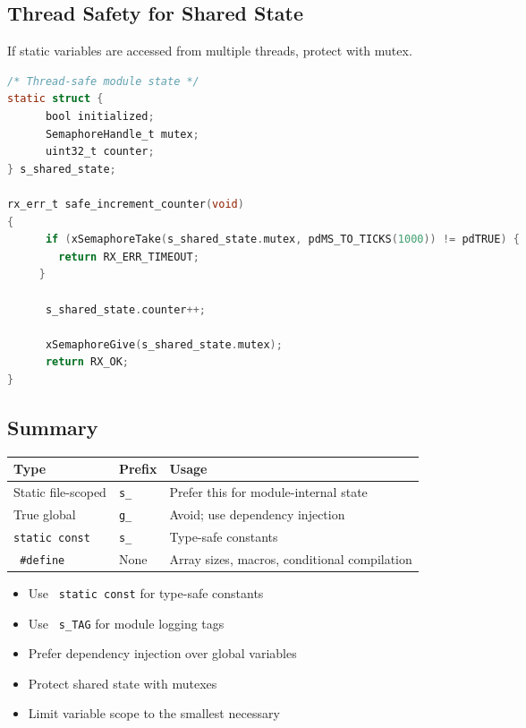 \subsection{Thread Safety for Shared State}

If static variables are accessed from multiple threads, protect with mutex.

\begin{lstlisting}[language=C]
/* Thread-safe module state */
static struct {
      bool initialized;
      SemaphoreHandle_t mutex;
      uint32_t counter;
} s_shared_state;

rx_err_t safe_increment_counter(void)
{
      if (xSemaphoreTake(s_shared_state.mutex, pdMS_TO_TICKS(1000)) != pdTRUE) {
        return RX_ERR_TIMEOUT;
     }

      s_shared_state.counter++;

      xSemaphoreGive(s_shared_state.mutex);
      return RX_OK;
}
\end{lstlisting}

\subsection{Summary}

\begin{center}
\begin{tabular}{|l|l|l|}
\hline
\textbf{Type} & \textbf{Prefix} & \textbf{Usage} \\
\hline
Static file-scoped & \texttt{s\_} & Prefer this for module-internal state \\
\hline
True global & \texttt{g\_} & Avoid; use dependency injection \\
\hline
\texttt{static const} & \texttt{s\_} & Type-safe constants \\
\hline
\texttt{
      \#define} & None & Array sizes, macros, conditional compilation \\
\hline
\end{tabular}
\end{center}

\begin{itemize}
    \item Use \texttt{
      static const} for type-safe constants
    \item Use \texttt{
      s\_TAG} for module logging tags
    \item Prefer dependency injection over global variables
    \item Protect shared state with mutexes
    \item Limit variable scope to the smallest necessary
\end{itemize}




